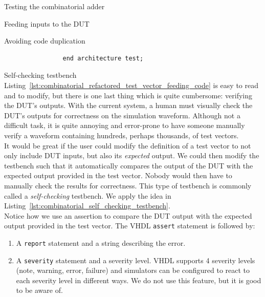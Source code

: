 \documentclass[a4paper, 12pt, onecolumn]{article}
\begin{document}
\begin{section}{Testing the combinatorial adder}
\begin{subsection}{Feeding inputs to the DUT}
\begin{subsubsection}{Avoiding code duplication}
\begin{verbatim}
                end architecture test;
            \end{verbatim}
            \vspace{-1em}
        \end{subsubsection}

        \clearpage

        \begin{subsubsection}{Self-checking testbench}
            Listing~\ref{lst:combinatorial_refactored_test_vector_feeding_code} is easy to read and to modify, but there is one last thing which is quite cumbersome: verifying the DUT's outputs. With the current system, a human must visually check the DUT's outputs for correctness on the simulation waveform. Although not a difficult task, it is quite annoying and error-prone to have someone manually verify a waveform containing hundreds, perhaps thousands, of test vectors. \\

            It would be great if the user could modify the definition of a test vector to not only include DUT inputs, but also its \emph{expected} output. We could then modify the testbench such that it automatically compares the output of the DUT with the expected output provided in the test vector. Nobody would then have to manually check the results for correctness. This type of testbench is commonly called a \emph{self-checking} testbench. We apply the idea in Listing~\ref{lst:combinatorial_self_checking_testbench}. \\

            Notice how we use an assertion to compare the DUT output with the expected output provided in the test vector. The VHDL \texttt{assert} statement is followed by:

            \begin{enumerate}
                \item A \texttt{report} statement and a string describing the error.
                \item A \texttt{severity} statement and a severity level. VHDL supports 4 severity levels (note, warning, error, failure) and simulators can be configured to react to each severity level in different ways. We do not use this feature, but it is good to be aware of.
            \end{enumerate}


\end{subsubsection}
\end{subsection}
\end{section}
\end{document}

